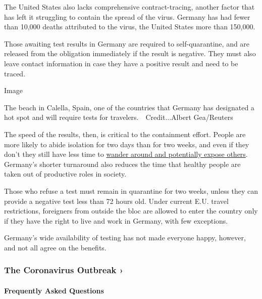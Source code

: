 The United States also lacks comprehensive contract-tracing, another
factor that has left it struggling to contain the spread of the virus.
Germany has had fewer than 10,000 deaths attributed to the virus, the
United States more than 150,000.

Those awaiting test results in Germany are required to self-quarantine,
and are released from the obligation immediately if the result is
negative. They must also leave contact information in case they have a
positive result and need to be traced.

Image

The beach in Calella, Spain, one of the countries that Germany has
designated a hot spot and will require tests for
travelers.~~Credit...Albert Gea/Reuters

The speed of the results, then, is critical to the containment effort.
People are more likely to abide isolation for two days than for two
weeks, and even if they don't they still have less time to
\href{https://www.theatlantic.com/politics/archive/2020/03/rand-paul-coronavirus-test-reckless/608593/}{wander
around and potentially expose others}. Germany's shorter turnaround also
reduces the time that healthy people are taken out of productive roles
in society.

Those who refuse a test must remain in quarantine for two weeks, unless
they can provide a negative test less than 72 hours old. Under current
E.U. travel restrictions, foreigners from outside the bloc are allowed
to enter the country only if they have the right to live and work in
Germany, with few exceptions.

Germany's wide availability of testing has not made everyone happy,
however, and not all agree on the benefits.

\href{https://www.nytimes.com/news-event/coronavirus?action=click\&pgtype=Article\&state=default\&region=MAIN_CONTENT_3\&context=storylines_faq}{}

\hypertarget{the-coronavirus-outbreak-}{%
\subsubsection{The Coronavirus Outbreak
›}\label{the-coronavirus-outbreak-}}

\hypertarget{frequently-asked-questions}{%
\paragraph{Frequently Asked
Questions}\label{frequently-asked-questions}}

